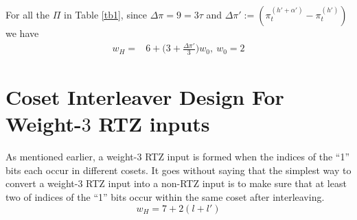 \documentclass[11pt, oneside, dvipdfmx]{book}
\begin{document}
For all the $\Pi$ in Table \ref{tb1}, since $\Delta \pi = 9=3\tau$ and $\Delta \pi':=(\pi^{(h'+\alpha')}_{t}-\pi^{(h')}_{t})$  we have
\begin{equation}
\begin{split}
w_H=&6+\Big(3+\frac{\Delta \pi'}{3}\Big)w_0,~w_0=2
\end{split}
\end{equation}








\section{Coset Interleaver Design For Weight-$3$ RTZ inputs}
As mentioned earlier, a weight-$3$ RTZ input is formed when the indices of the ``1'' bits each occur in different cosets.  It goes without saying that the simplest way to convert a weight-$3$ RTZ input into a non-RTZ input is to make sure that at least two of indices of the ``1'' bits occur within the same coset after interleaving.
\begin{equation}
w_H=
7+2(l+l') 
\label{eq6}
\end{equation}
\end{document}
